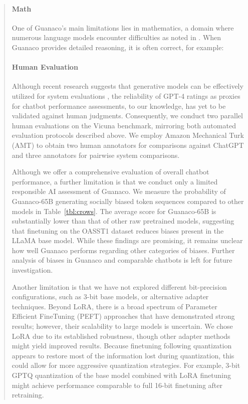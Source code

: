 \begin{quote}
\paragraph{Math} One of {Guanaco}'s main limitations lies in mathematics, a domain where numerous language models encounter difficulties as noted in \citep{liang2022holistic}. When {Guanaco} provides detailed reasoning, it is often correct, for example:

\paragraph{Human Evaluation} Although recent research suggests that generative models can be effectively utilized for system evaluations \citep{fu2023gptscore}, the reliability of GPT-4 ratings as proxies for chatbot performance assessments, to our knowledge, has yet to be validated against human judgments. Consequently, we conduct two parallel human evaluations on the Vicuna benchmark, mirroring both automated evaluation protocols described above. We employ Amazon Mechanical Turk (AMT) to obtain two human annotators for comparisons against ChatGPT and three annotators for pairwise system comparisons.

Although we offer a comprehensive evaluation of overall chatbot performance, a further limitation is that we conduct only a limited responsible AI assessment of {Guanaco}. We measure the probability of {Guanaco}-65B generating socially biased token sequences compared to other models in Table~\ref{tbl:crows}. The average score for {Guanaco}-65B is substantially lower than that of other raw pretrained models, suggesting that finetuning on the OASST1 dataset reduces biases present in the LLaMA base model. While these findings are promising, it remains unclear how well {Guanaco} performs regarding other categories of biases. Further analysis of biases in {Guanaco} and comparable chatbots is left for future investigation.

Another limitation is that we have not explored different bit-precision configurations, such as 3-bit base models, or alternative adapter techniques. Beyond LoRA, there is a broad spectrum of Parameter Efficient FineTuning (PEFT) approaches that have demonstrated strong results; however, their scalability to large models is uncertain. We chose LoRA due to its established robustness, though other adapter methods might yield improved results. Because finetuning following quantization appears to restore most of the information lost during quantization, this could allow for more aggressive quantization strategies. For example, 3-bit GPTQ quantization of the base model combined with LoRA finetuning might achieve performance comparable to full 16-bit finetuning after retraining.


\end{quote}
